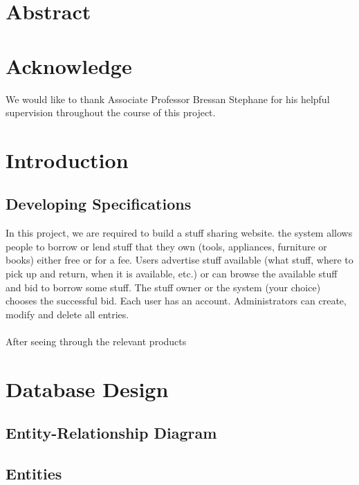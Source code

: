 \section*{Abstract}
\newpage

\section*{Acknowledge}
We would like to thank Associate Professor Bressan Stephane for his helpful supervision
throughout the course of this project.
\newpage
\tableofcontents
\newpage

\section{Introduction}

\subsection{Developing Specifications}
In this project, we are required to build a stuff sharing website. the system allows people to borrow or lend stuff that they own (tools, appliances, furniture or books) either free or for a fee. Users advertise stuff available (what stuff, where to pick up and return, when it is available, etc.) or can browse the available stuff and bid to borrow some stuff. The stuff owner or the system (your choice) chooses the successful bid. Each user has an account. Administrators can create, modify and delete all entries.\\
\\
After seeing through the relevant products

\newpage

\section{Database Design}

\subsection{Entity-Relationship Diagram}
\newpage

\subsection{Entities}

